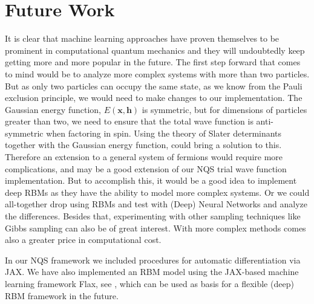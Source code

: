 \section{Future Work}\label{sec:Future}

It is clear that machine learning approaches have proven themselves to be prominent in computational quantum mechanics and they will undoubtedly keep getting more and more popular in the future. 
The first step forward that comes to mind would be to analyze more complex systems with more than two particles. But as only two particles can occupy the same state, as we know from the Pauli exclusion principle, we would need to make changes to our implementation. The Gaussian energy function, $E(\mathbf{x}, \mathbf{h})$ is symmetric, but for dimensions of particles greater than two, we need to ensure that the total wave function is anti-symmetric when factoring in spin. Using the theory of Slater determinants together with the Gaussian energy function, could bring a solution to this. Therefore an extension to a general system of fermions would require more complications, and may be a good extension of our NQS trial wave function implementation. But to accomplish this, it would be a good idea to implement deep RBMs as they have the ability to model more complex systems. Or we could all-together drop using RBMs and test with (Deep) Neural Networks and analyze the differences. Besides that, experimenting with other sampling techniques like Gibbs sampling can also be of great interest. With more complex methods comes also a greater price in computational cost.

In our NQS framework we included procedures for automatic differentiation via JAX. We have also implemented an RBM model using the JAX-based machine learning framework Flax, see
, which can be used as basis for a flexible (deep) RBM framework in the future. 
